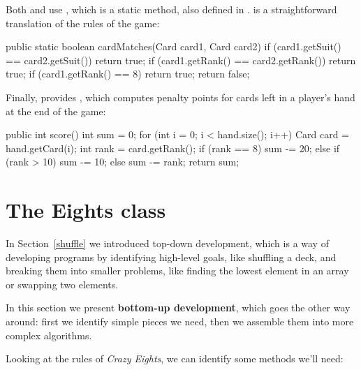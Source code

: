 Both  and  use , which is a static method, also defined in .
 is a straightforward translation of the rules of the game:

\begin{code}
public static boolean cardMatches(Card card1, Card card2) {
    if (card1.getSuit() == card2.getSuit()) {
        return true;
    }
    if (card1.getRank() == card2.getRank()) {
        return true;
    }
    if (card1.getRank() == 8) {
        return true;
    }
    return false;
}
\end{code}

Finally,  provides , which computes penalty points for cards left in a player's hand at the end of the game:

\begin{code}
public int score() {
    int sum = 0;
    for (int i = 0; i < hand.size(); i++) {
        Card card = hand.getCard(i);
        int rank = card.getRank();
        if (rank == 8) {
            sum -= 20;
        } else if (rank > 10) {
            sum -= 10;
        } else {
            sum -= rank;
        }
    }
    return sum;
}
\end{code}


\section{The Eights class}


In Section~\ref{shuffle} we introduced top-down development, which is a way of developing programs by identifying high-level goals, like shuffling a deck, and breaking them into smaller problems, like finding the lowest element in an array or swapping two elements.


In this section we present {\bf bottom-up development}, which goes the other way around: first we identify simple pieces we need, then we assemble them into more complex algorithms.

Looking at the rules of {\it Crazy Eights}, we can identify some methods we'll need:

